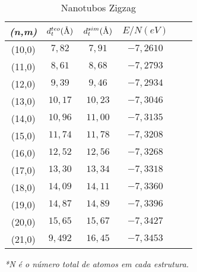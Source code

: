\documentclass[12pt,a4paper]{article}
\author{Antonio Lívio}
\newcommand{\angstrom}{\textup{\AA}}
\begin{document}
\begin{table}[h]
\centering
\caption{Nanotubos Zigzag}
\begin{tabular}{|c|c|c|c|c|c|}
\hline
 
\textit{(n,m)} & $d_{t}^{teo}(\angstrom)$ & $d_{t}^{sim}(\angstrom)$ & $E/N(eV)$ \\ 
\hline 

(10,0) & $7,82$ & $7,91$ & $-7,2610$ \\ 
\hline
 
(11,0) & $8,61$ & $8,68$ & $-7,2793$ \\ 
\hline
 
(12,0) & $9,39$ & $9,46$ & $-7,2934$ \\ 
\hline
 
(13,0) & $10,17$ & $10,23$ & $-7,3046$ \\ 
\hline
 
(14,0) & $10,96$ & $11,00$ & $-7,3135$ \\ 
\hline
 
(15,0) & $11,74$ & $11,78$ & $-7,3208$ \\ 
\hline
 
(16,0) & $12,52$ & $12,56$ & $-7,3268$ \\ 
\hline
 
(17,0) & $13,30$ & $13,34$ & $-7,3318$ \\ 
\hline
 
(18,0) & $14,09$ & $14,11$ & $-7,3360$ \\ 
\hline

(19,0) & $14,87$ & $14,89$ & $-7,3396$ \\ 
\hline

(20,0) & $15,65$ & $15,67$ & $-7,3427$ \\ 
\hline

(21,0) & $9,492$ & $16,45$ & $-7,3453$ \\ 
\hline

\end{tabular} 
\end{table}
\emph{*N é o número total de atomos em cada estrutura.} 
\end{document}
